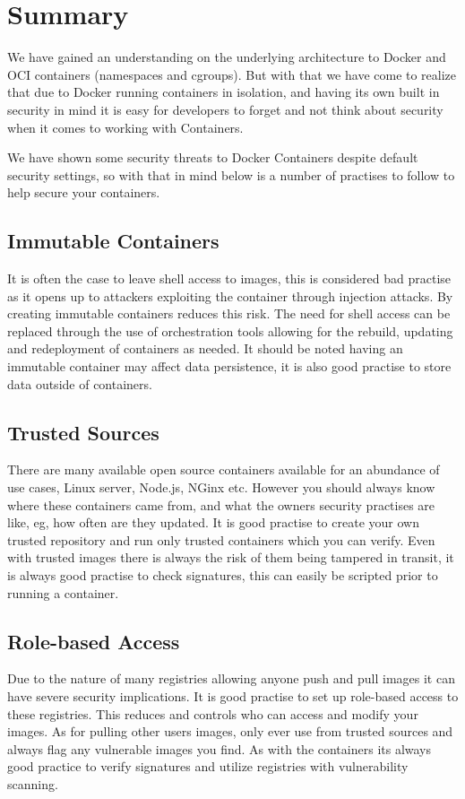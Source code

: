 \section{Summary}
\label{sub:summary}
We have gained an understanding on the underlying architecture to Docker and OCI containers (namespaces and cgroups). But with that we have come to realize that due to Docker running containers in isolation, and having its own built in security in mind it is easy for developers to forget and not think about security when it comes to working with Containers. 

We have shown some security threats to Docker Containers despite default security settings, so with that in mind below is a number of practises to follow to help secure your containers.

\subsection{Immutable Containers}
It is often the case to leave shell access to images, this is considered bad practise as it opens up to attackers exploiting the container through injection attacks. By creating immutable containers reduces this risk. The need for shell access can be replaced through the use of orchestration tools allowing for the rebuild, updating and redeployment of containers as needed.
It should be noted having an immutable container may affect data persistence, it is also good practise to store data outside of containers.
\subsection{Trusted Sources}
There are many available open source containers available for an abundance of use cases, Linux server, Node.js, NGinx etc. However you should always know where these containers came from, and what the owners security practises are like, eg, how often are they updated. It is good practise to create your own trusted repository and run only trusted containers which you can verify.
Even with trusted images there is always the risk of them being tampered in transit, it is always good practise to check signatures, this can easily be scripted prior to running a container.
\subsection{Role-based Access}
Due to the nature of many registries allowing anyone push and pull images it can have severe security implications. It is good practise to set up role-based access to these registries. This reduces and controls who can access and modify your images. As for pulling other users images, only ever use from trusted sources and always flag any vulnerable images you find.  As with the containers its always good practice to verify signatures and utilize registries with vulnerability scanning.

